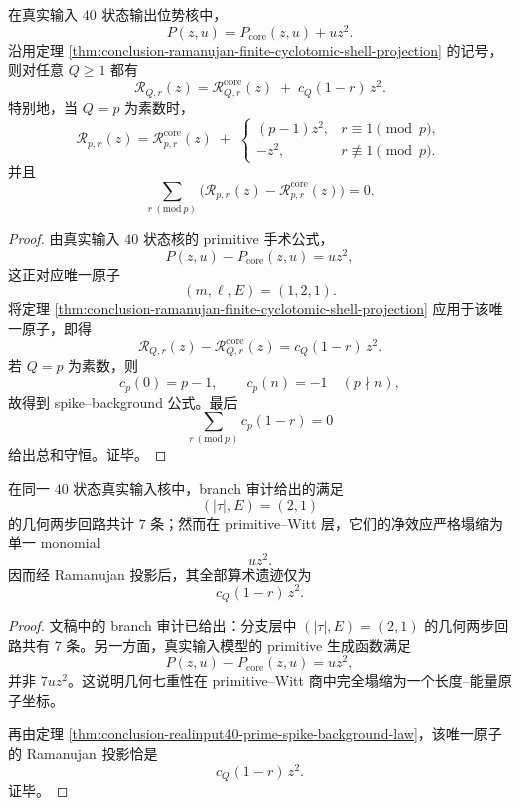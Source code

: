 \begin{theorem}\label{thm:conclusion-realinput40-prime-spike-background-law}
在真实输入 \(40\) 状态输出位势核中，
\[
P(z,u)=P_{\mathrm{core}}(z,u)+u z^2.
\]
沿用定理 \ref{thm:conclusion-ramanujan-finite-cyclotomic-shell-projection} 的记号，则对任意 \(Q\ge 1\) 都有
\[
\mathcal R_{Q,r}(z)
=
\mathcal R_{Q,r}^{\mathrm{core}}(z)
\;+\;
c_Q(1-r)\,z^2.
\]
特别地，当 \(Q=p\) 为素数时，
\[
\mathcal R_{p,r}(z)
=
\mathcal R_{p,r}^{\mathrm{core}}(z)
\;+\;
\begin{cases}
(p-1)z^2, & r\equiv 1\pmod p,\\[3pt]
-z^2, & r\not\equiv 1\pmod p.
\end{cases}
\]
并且
\[
\sum_{r\ (\mathrm{mod}\ p)}
\bigl(\mathcal R_{p,r}(z)-\mathcal R_{p,r}^{\mathrm{core}}(z)\bigr)=0.
\]
\end{theorem}
\begin{proof}
由真实输入 \(40\) 状态核的 primitive 手术公式，
\[
P(z,u)-P_{\mathrm{core}}(z,u)=u z^2,
\]
这正对应唯一原子
\[
(m,\ell,E)=(1,2,1).
\]
将定理 \ref{thm:conclusion-ramanujan-finite-cyclotomic-shell-projection} 应用于该唯一原子，即得
\[
\mathcal R_{Q,r}(z)-\mathcal R_{Q,r}^{\mathrm{core}}(z)=c_Q(1-r)\,z^2.
\]
若 \(Q=p\) 为素数，则
\[
c_p(0)=p-1,
\qquad
c_p(n)=-1\quad (p\nmid n),
\]
故得到 spike--background 公式。最后
\[
\sum_{r\ (\mathrm{mod}\ p)}c_p(1-r)=0
\]
给出总和守恒。证毕。
\end{proof}

\begin{proposition}\label{prop:conclusion-realinput40-seven-two-step-loops-collapse}
在同一 \(40\) 状态真实输入核中，branch 审计给出的满足
\[
(|\tau|,E)=(2,1)
\]
的几何两步回路共计 \(7\) 条；然而在 primitive--Witt 层，它们的净效应严格塌缩为单一 monomial
\[
u z^2.
\]
因而经 Ramanujan 投影后，其全部算术遗迹仅为
\[
c_Q(1-r)\,z^2.
\]
\end{proposition}
\begin{proof}
文稿中的 branch 审计已给出：分支层中 \((|\tau|,E)=(2,1)\) 的几何两步回路共有 \(7\) 条。另一方面，真实输入模型的 primitive 生成函数满足
\[
P(z,u)-P_{\mathrm{core}}(z,u)=u z^2,
\]
并非 \(7u z^2\)。这说明几何七重性在 primitive--Witt 商中完全塌缩为一个长度--能量原子坐标。

再由定理 \ref{thm:conclusion-realinput40-prime-spike-background-law}，该唯一原子的 Ramanujan 投影恰是
\[
c_Q(1-r)\,z^2.
\]
证毕。
\end{proof}

